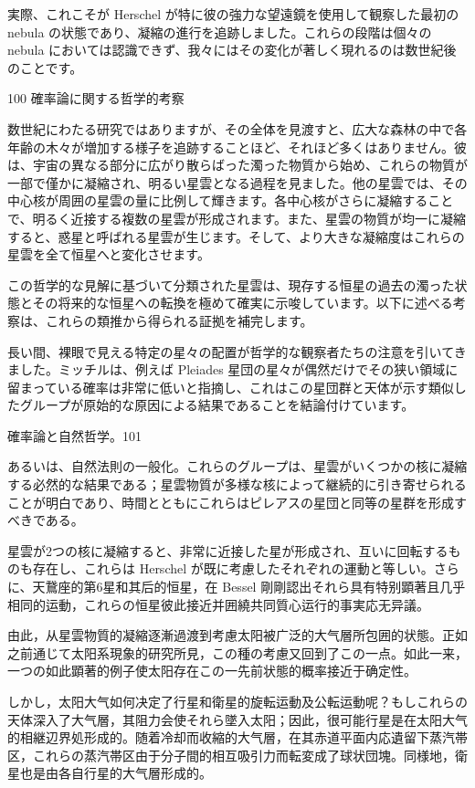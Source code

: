 \documentclass[a4paper,11pt,openany]{ltjsbook}
\begin{document}
実際、これこそが Herschel が特に彼の強力な望遠鏡を使用して観察した最初の nebula の状態であり、凝縮の進行を追跡しました。これらの段階は個々の nebula においては認識できず、我々にはその変化が著しく現れるのは数世紀後のことです。

100     確率論に関する哲学的考察

数世紀にわたる研究ではありますが、その全体を見渡すと、広大な森林の中で各年齢の木々が増加する様子を追跡することほど、それほど多くはありません。彼は、宇宙の異なる部分に広がり散らばった濁った物質から始め、これらの物質が一部で僅かに凝縮され、明るい星雲となる過程を見ました。他の星雲では、その中心核が周囲の星雲の量に比例して輝きます。各中心核がさらに凝縮することで、明るく近接する複数の星雲が形成されます。また、星雲の物質が均一に凝縮すると、惑星と呼ばれる星雲が生じます。そして、より大きな凝縮度はこれらの星雲を全て恒星へと変化させます。

この哲学的な見解に基づいて分類された星雲は、現存する恒星の過去の濁った状態とその将来的な恒星への転換を極めて確実に示唆しています。以下に述べる考察は、これらの類推から得られる証拠を補完します。

長い間、裸眼で見える特定の星々の配置が哲学的な観察者たちの注意を引いてきました。ミッチルは、例えば Pleiades 星団の星々が偶然だけでその狭い領域に留まっている確率は非常に低いと指摘し、これはこの星団群と天体が示す類似したグループが原始的な原因による結果であることを結論付けています。

確率論と自然哲学。101

あるいは、自然法則の一般化。これらのグループは、星雲がいくつかの核に凝縮する必然的な結果である；星雲物質が多様な核によって継続的に引き寄せられることが明白であり、時間とともにこれらはピレアスの星団と同等の星群を形成すべきである。

星雲が2つの核に凝縮すると、非常に近接した星が形成され、互いに回転するものも存在し、これらは Herschel が既に考慮したそれぞれの運動と等しい。さらに、天鵞座的第6星和其后的恒星，在 Bessel 剛剛認出それら具有特别顕著且几乎相同的运動，これらの恒星彼此接近并囲繞共同質心运行的事実応无异議。

由此，从星雲物質的凝縮逐漸過渡到考慮太阳被广泛的大气層所包囲的状態。正如之前通じて太阳系現象的研究所見，この種の考慮又回到了この一点。如此一来，一つの如此顕著的例子使太阳存在この一先前状態的概率接近于确定性。

しかし，太阳大气如何决定了行星和衛星的旋転运動及公転运動呢？もしこれらの天体深入了大气層，其阻力会使それら墜入太阳；因此，很可能行星是在太阳大气的相継辺界処形成的。随着冷却而收縮的大气層，在其赤道平面内応遺留下蒸汽帯区，これらの蒸汽帯区由于分子間的相互吸引力而転変成了球状団塊。同様地，衛星也是由各自行星的大气層形成的。
\end{document}
